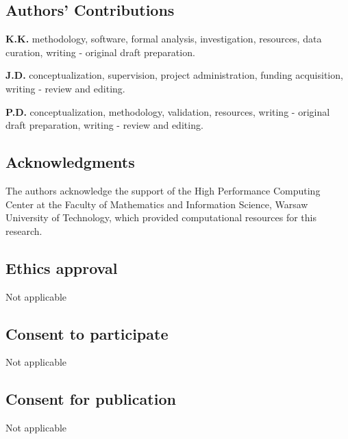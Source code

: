 \documentclass[pdflatex,sn-mathphys-num]{sn-jnl}
\theoremstyle{thmstyleone}%
\theoremstyle{thmstyletwo}%
\theoremstyle{thmstylethree}%
\begin{document}
\subsection*{Authors' Contributions}

\textbf{K.K.} methodology, software, formal analysis, investigation, resources, data curation, writing - original draft preparation.

\noindent
\textbf{J.D.} conceptualization, supervision, project administration, funding acquisition, writing - review and editing.

\noindent
\textbf{P.D.} conceptualization, methodology, validation, resources, writing - original draft preparation, writing - review and editing.


\subsection*{Acknowledgments}
The authors acknowledge the support of the High Performance Computing Center at the Faculty of Mathematics and Information Science, Warsaw University of Technology, which provided computational resources for this research.

\subsection*{Ethics approval}
Not applicable

\subsection*{Consent to participate}
Not applicable

\subsection*{Consent for publication}
Not applicable

\end{document}
